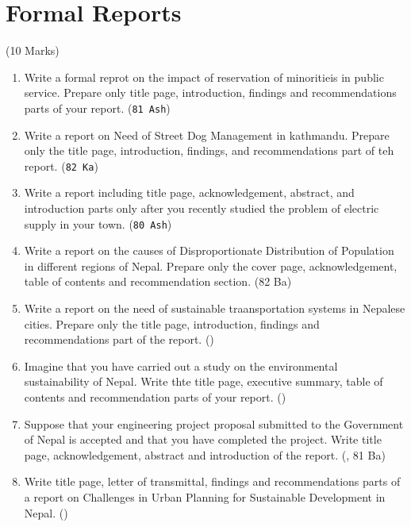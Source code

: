 \documentclass[12pt]{article}
\begin{document}
\pagebreak

\section{Formal Reports}
  \begin{center}(10 Marks)\end{center}

  \begin{enumerate}
    \item Write a formal reprot on the impact of reservation of minoritieis in public service. Prepare only title page, introduction, findings and recommendations parts of your report. \hfill (\texttt{81 Ash})

    \item Write a report on Need of Street Dog Management in kathmandu. Prepare only the title page, introduction, findings, and recommendations part of teh report. \hfill (\texttt{82 Ka})
      
    \item Write a report including title page, acknowledgement, abstract, and introduction parts only after you recently studied  the problem of electric supply in your town. \hfill (\texttt{80 Ash})

    \item Write a report on the causes of Disproportionate Distribution of Population in different regions of Nepal. Prepare only the cover page, acknowledgement, table of contents and recommendation section. \hfill (82 Ba)

    \item Write a report on the need of sustainable traansportation systems in Nepalese cities. Prepare only the title page, introduction, findings and recommendations part of the report. \hfill ()

    \item Imagine that you have carried out a study on the environmental sustainability of Nepal. Write thte title page, executive summary, table of contents and recommendation parts of your report. \hfill ()

    \item Suppose that your engineering project proposal submitted to the Government of Nepal is accepted and that you have completed the project. Write title page, acknowledgement, abstract and introduction of the report. \hfill (, 81 Ba)

    \item Write title page, letter of transmittal, findings and recommendations parts of a report on Challenges in Urban Planning for Sustainable Development in Nepal. \hfill ()


\end{enumerate}
\end{document}

